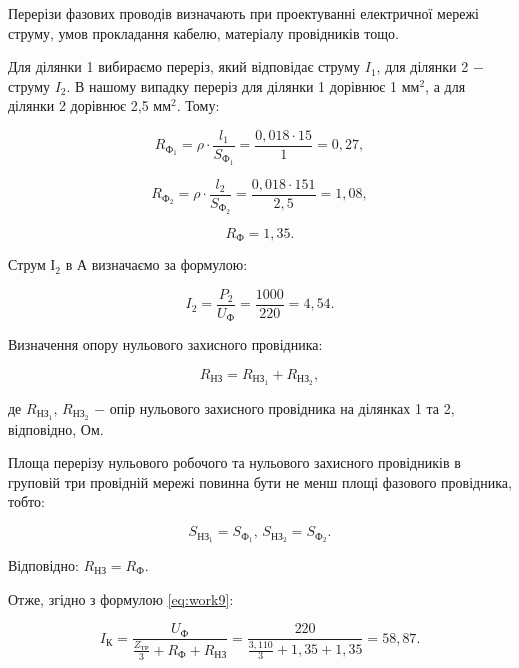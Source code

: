 \vspace{1.5em}

Перерізи фазових проводів визначають при проектуванні електричної мережі струму, умов прокладання кабелю, матеріалу провідників тощо.

Для ділянки 1 вибираємо переріз, який відповідає струму $I_{1}$, для ділянки 2 $-$ струму $I_{2}$. В нашому випадку переріз для ділянки 1 дорівнює 1 $\text{мм}^{2}$, а для ділянки 2  дорівнює 2,5 $\text{мм}^{2}$. Тому:

\[
	R_{\text{Ф}_{1}} = \rho \cdot \frac{l_{1}}{S_{\text{Ф}_{1}}} = \frac{0,018 \cdot 15}{1} = 0,27,
\]

\[
	R_{\text{Ф}_{2}} = \rho \cdot \frac{l_{2}}{S_{\text{Ф}_{2}}} = \frac{0,018 \cdot 151}{2,5} = 1,08,
\]

\[
	R_{\text{Ф}} = 1,35.
\]

\vspace{1.5em}

Струм $І_{2}$ в А визначаємо за формулою:

\begin{equation}\label{eq:work13}
	I_{2} = \frac{P_{2}}{U_{\text{Ф}}} = \frac{1000}{220} = 4,54.
\end{equation}

\vspace{1.5em}

Визначення опору нульового захисного провідника:

\begin{equation}\label{eq:work14}
	R_{\text{НЗ}} = R_{\text{НЗ}_{1}} + R_{\text{НЗ}_{2}},
\end{equation}

\noindent де $R_{\text{НЗ}_{1}}, \, R_{\text{НЗ}_{2}}$ $-$ опір нульового захисного провідника на ділянках 1 та 2,     відповідно, Ом.

Площа перерізу нульового робочого та нульового захисного провідників в груповій три провідній мережі повинна бути не менш площі фазового провідника, тобто:

\[
	S_{\text{НЗ}_{1}} = S_{\text{Ф}_{1}}, \, S_{\text{НЗ}_{2}} = S_{\text{Ф}_{2}}.
\]

\vspace{1.5em}

Відповідно: $R_{\text{НЗ}} = R_{\text{Ф}}$.

Отже, згідно з формулою \ref{eq:work9}:

\[
	I_{\text{К}} = \frac{U_{\text{Ф}}}{\frac{Z_{\text{ТР}}}{3} + R_{\text{Ф}} + R_{\text{НЗ}}} = \frac{220}{\frac{3,110}{3} + 1,35 + 1,35} = 58,87.
\]

